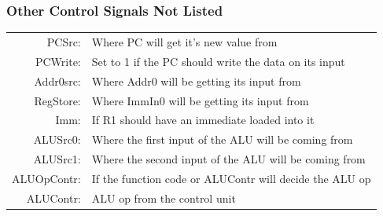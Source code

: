 \documentclass{article}
\begin{document}
		\subsubsection{Other Control Signals Not Listed}
			\begin{tabular}{ r p{12cm} }
				     PCSrc: & Where PC will get it's new value from\\
				   PCWrite: & Set to 1 if the PC should write the data on its input\\
				  Addr0src: & Where Addr0 will be getting its input from\\
				  RegStore: & Where ImmIn0 will be getting its input from\\
				       Imm: & If R1 should have an immediate loaded into it\\
				   ALUSrc0: & Where the first input of the ALU will be coming from\\
				   ALUSrc1: & Where the second input of the ALU will be coming from\\
				ALUOpContr: & If the function code or ALUContr will decide the ALU op\\
				  ALUContr: & ALU op from the control unit\\
			\end{tabular}
\end{document}
